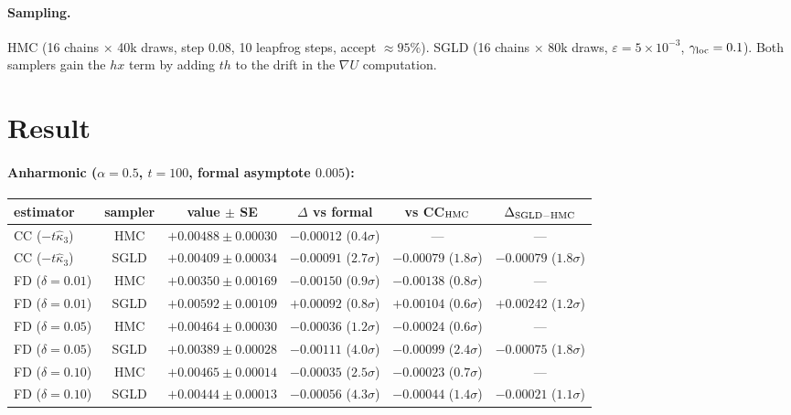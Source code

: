 \documentclass[11pt]{article}
\begin{document}
\paragraph{Sampling.} HMC (16 chains × 40k draws, step 0.08, 10
leapfrog steps, accept $\approx 95\%$). SGLD (16 chains × 80k draws,
$\varepsilon = 5{\times}10^{-3}$, $\gamma_{\rm loc} = 0.1$). Both
samplers gain the $h x$ term by adding $t h$ to the drift in the
$\nabla U$ computation.

\section{Result}

\paragraph{Anharmonic ($\alpha = 0.5$, $t = 100$, formal asymptote $0.005$):}

\begin{center}\scriptsize
\begin{tabular}{lccccc}
\toprule
estimator & sampler & value $\pm$ SE & $\Delta$ vs formal & vs CC$_{\rm HMC}$ & $\Delta_{\rm SGLD-HMC}$ \\
\midrule
CC ($-t \hat\kappa_3$)     & HMC  & $+0.00488 \pm 0.00030$ & $-0.00012$ ($0.4\sigma$) & ---                  & ---                     \\
CC ($-t \hat\kappa_3$)     & SGLD & $+0.00409 \pm 0.00034$ & $-0.00091$ ($2.7\sigma$) & $-0.00079$ ($1.8\sigma$) & $-0.00079$ ($1.8\sigma$) \\
FD ($\delta = 0.01$)       & HMC  & $+0.00350 \pm 0.00169$ & $-0.00150$ ($0.9\sigma$) & $-0.00138$ ($0.8\sigma$) & ---                     \\
FD ($\delta = 0.01$)       & SGLD & $+0.00592 \pm 0.00109$ & $+0.00092$ ($0.8\sigma$) & $+0.00104$ ($0.6\sigma$) & $+0.00242$ ($1.2\sigma$) \\
FD ($\delta = 0.05$)       & HMC  & $+0.00464 \pm 0.00030$ & $-0.00036$ ($1.2\sigma$) & $-0.00024$ ($0.6\sigma$) & ---                     \\
FD ($\delta = 0.05$)       & SGLD & $+0.00389 \pm 0.00028$ & $-0.00111$ ($4.0\sigma$) & $-0.00099$ ($2.4\sigma$) & $-0.00075$ ($1.8\sigma$) \\
FD ($\delta = 0.10$)       & HMC  & $+0.00465 \pm 0.00014$ & $-0.00035$ ($2.5\sigma$) & $-0.00023$ ($0.7\sigma$) & ---                     \\
FD ($\delta = 0.10$)       & SGLD & $+0.00444 \pm 0.00013$ & $-0.00056$ ($4.3\sigma$) & $-0.00044$ ($1.4\sigma$) & $-0.00021$ ($1.1\sigma$) \\
\bottomrule
\end{tabular}
\end{center}
\end{document}
